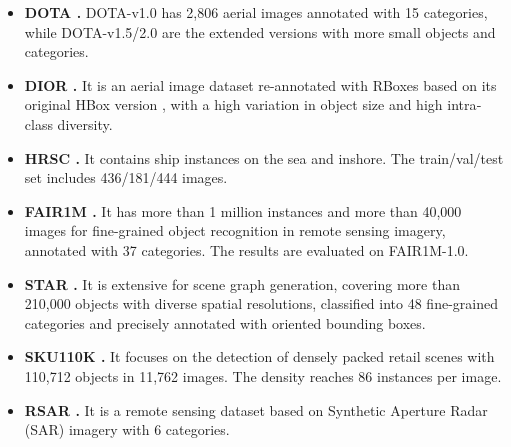 \begin{itemize}
    \item \textbf{DOTA \cite{xia2018dota}.} DOTA-v1.0 has 2,806 aerial images annotated with 15 categories, while DOTA-v1.5/2.0 are the extended versions with more small objects and categories.
    
    \item \textbf{DIOR \cite{cheng2022anchor}.} It is an aerial image dataset re-annotated with RBoxes based on its original HBox version \cite{li2020object}, with a high variation in object size and high intra‐class diversity. 

    \item \textbf{HRSC \cite{liu2017hrsc}.} It contains ship instances on the sea and inshore. The train/val/test set includes 436/181/444 images.

    \item \textbf{FAIR1M \cite{sun2022fair1m}.} It has more than 1 million instances and more than 40,000 images for fine-grained object recognition in remote sensing imagery, annotated with 37 categories. The results are evaluated on FAIR1M-1.0.

    \item \textbf{STAR \cite{li2024star}.} It is extensive for scene graph generation, covering more than 210,000 objects with diverse spatial resolutions, classified into 48 fine-grained categories and precisely annotated with oriented bounding boxes. 

    \item \textbf{SKU110K \cite{pan2020dynamic}.} It focuses on the detection of densely packed retail scenes with 110,712 objects in 11,762 images. The density reaches 86 instances per image. 

    \item \textbf{RSAR \cite{zhang2025rsar}.} It is a remote sensing dataset based on Synthetic Aperture Radar (SAR) imagery with 6 categories.

\end{itemize}

